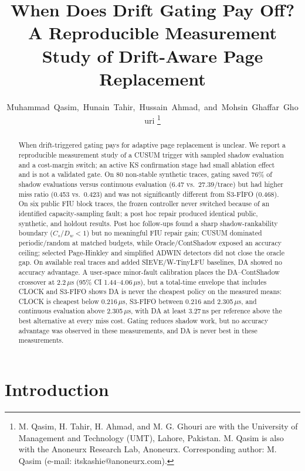 \documentclass[10pt,twocolumn,a4paper]{IEEEtran}
\begin{document}
\title{When Does Drift Gating Pay Off? A Reproducible Measurement Study of Drift-Aware Page Replacement}

\author{Muhammad~Qasim,~Hunain~Tahir,~Hussain~Ahmad,~and~Mohsin~Ghaffar~Ghouri%
\thanks{M. Qasim, H. Tahir, H. Ahmad, and M. G. Ghouri are with the University
of Management and Technology (UMT), Lahore, Pakistan. M. Qasim is also with the
Anoneurx Research Lab, Anoneurx. Corresponding author: M. Qasim (e-mail:
itskashie@anoneurx.com).}}

\maketitle

\begin{abstract}
When drift-triggered gating pays for adaptive page replacement is unclear. We
report a reproducible measurement study of a CUSUM trigger with sampled
shadow evaluation and a cost-margin switch; an active KS confirmation stage had
small ablation effect and is not a validated gate. On 80 non-stable synthetic
traces, gating saved 76\% of shadow evaluations versus continuous evaluation
(6.47 vs.\ 27.39/trace) but had higher miss ratio (0.453 vs.\ 0.423) and was
not significantly different from S3-FIFO (0.468). On six public FIU block
traces, the frozen controller never switched because of an identified
capacity-sampling fault; a post hoc repair produced identical public,
synthetic, and holdout results. Post hoc follow-ups found a sharp
shadow-rankability boundary ($C_s/D_w<1$) but no meaningful FIU repair gain;
CUSUM dominated periodic/random at matched budgets, while Oracle/ContShadow
exposed an accuracy ceiling; selected Page-Hinkley and simplified ADWIN
detectors did not close the oracle gap. On available real traces and added
SIEVE/W-TinyLFU baselines, DA showed no accuracy advantage. A user-space
minor-fault calibration places the DA--ContShadow crossover at 2.2\,$\mu$s
(95\% CI 1.44--4.06\,$\mu$s), but a total-time envelope that includes CLOCK and
S3-FIFO shows DA is never the cheapest policy on the measured means: CLOCK is
cheapest below 0.216\,$\mu$s, S3-FIFO between 0.216 and 2.305\,$\mu$s, and
continuous evaluation above 2.305\,$\mu$s, with DA at least 3.27\,ns per
reference above the best alternative at every miss cost. Gating reduces shadow
work, but no accuracy advantage was observed in these measurements, and DA is
never best in these measurements.
\end{abstract}

\section{Introduction}
\label{sec:intro}
\end{document}

